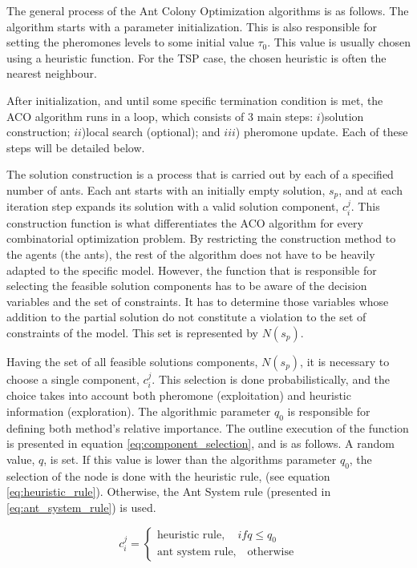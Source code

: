 The general process of the Ant Colony Optimization algorithms is as follows. The algorithm starts with a parameter initialization. This is also responsible for setting the pheromones levels to some initial value $\tau_{0}$.
This value is usually chosen using a heuristic function. For the TSP case, the chosen heuristic is often the nearest neighbour.

After initialization, and until some specific termination condition is met, the ACO algorithm runs in a loop, which consists of 3 main steps: $i$)solution construction; $ii$)local search (optional); and $iii$) pheromone update. Each of these steps will be detailed below.

The solution construction is a process that is carried out by each of a specified number of ants. Each ant starts with an initially empty solution, $s_{p}$, and at each iteration step expands its solution with a valid solution component, $c_{i}^{j}$. This construction function is what differentiates the ACO algorithm for every combinatorial optimization problem. By restricting the construction method to the agents (the ants), the rest of the algorithm does not have to be heavily adapted to the specific model. However, the function that is responsible for selecting the feasible solution components has to be aware of the decision variables and the set of constraints. It has to determine those variables whose addition to the partial solution do not constitute a violation to the set of constraints of the model. This set is represented by $N(s_{p})$.

Having the set of all feasible solutions components, $N(s_{p})$, it is necessary to choose a single component, $c_{i}^{j}$. This selection is done probabilistically, and the choice takes into account both pheromone (exploitation) and heuristic information (exploration). The algorithmic parameter $q_{0}$ is responsible for defining both method's relative importance. The outline execution of the function is presented in equation \ref{eq:component_selection}, and is as follows. A random value, $q$, is set. If this value is lower than the algorithms parameter $q_{0}$, the selection of the node is done with the heuristic rule, (see equation \ref{eq:heuristic_rule}). Otherwise, the Ant System rule (presented in \ref{eq:ant_system_rule}) is used.

\begin{equation} \label{eq:component_selection}
	c_{i}^{j} =
		\begin{cases}
			\textrm{heuristic rule}, \quad if q \leq q_{0} \\
			\textrm{ant system rule,} \quad \textrm{otherwise}
		\end{cases}
\end{equation}

